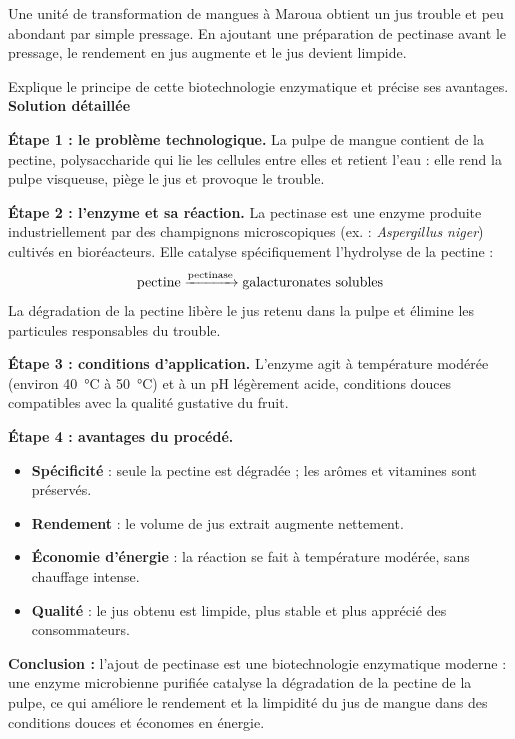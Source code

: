 \documentclass[11pt]{article}
\newcommand{\cle}[1]{{\popxbold\color{popdark}#1}}
\begin{document}
\begin{exoresolu}
Une unité de transformation de mangues à Maroua obtient un jus trouble et peu abondant par simple pressage. En ajoutant une préparation de pectinase avant le pressage, le rendement en jus augmente et le jus devient limpide.

Explique le principe de cette biotechnologie enzymatique et précise ses avantages.
\tcblower
\textbf{Solution détaillée}

\textbf{Étape 1 : le problème technologique.} La pulpe de mangue contient de la \cle{pectine}, polysaccharide qui lie les cellules entre elles et retient l'eau : elle rend la pulpe visqueuse, piège le jus et provoque le trouble.

\textbf{Étape 2 : l'enzyme et sa réaction.} La \cle{pectinase} est une enzyme produite industriellement par des champignons microscopiques (ex. : \emph{Aspergillus niger}) cultivés en bioréacteurs. Elle catalyse spécifiquement l'hydrolyse de la pectine :
\[ \ce{\text{pectine} ->[$\text{pectinase}$] \text{galacturonates solubles}} \]
La dégradation de la pectine libère le jus retenu dans la pulpe et élimine les particules responsables du trouble.

\textbf{Étape 3 : conditions d'application.} L'enzyme agit à température modérée (environ \SI{40}{\celsius} à \SI{50}{\celsius}) et à un pH légèrement acide, conditions douces compatibles avec la qualité gustative du fruit.

\textbf{Étape 4 : avantages du procédé.}
\begin{itemize}
\item \textbf{Spécificité} : seule la pectine est dégradée ; les arômes et vitamines sont préservés.
\item \textbf{Rendement} : le volume de jus extrait augmente nettement.
\item \textbf{Économie d'énergie} : la réaction se fait à température modérée, sans chauffage intense.
\item \textbf{Qualité} : le jus obtenu est limpide, plus stable et plus apprécié des consommateurs.
\end{itemize}

\textbf{Conclusion :} l'ajout de pectinase est une biotechnologie enzymatique moderne : une enzyme microbienne purifiée catalyse la dégradation de la pectine de la pulpe, ce qui améliore le rendement et la limpidité du jus de mangue dans des conditions douces et économes en énergie.
\end{exoresolu}
\end{document}
